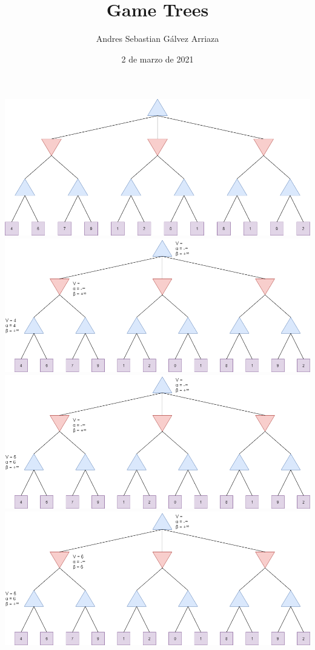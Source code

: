 \documentclass[]{scrreprt}
\title{Game Trees}
\author{Andres Sebastian Gálvez Arriaza}
\date{2 de marzo de 2021}
\begin{document}
\maketitle
\graphicspath{ {images/} }

\includegraphics[scale=0.45]{original} \newline \newline \newline
\includegraphics[scale=0.45]{step1} \newline \newline
\includegraphics[scale=0.45]{step2} \newline \newline \newline
\includegraphics[scale=0.45]{step3} \newline \newline
\end{document}
